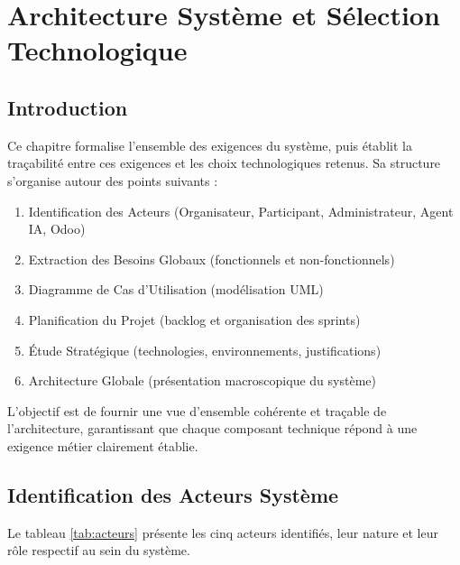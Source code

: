 \chapter{Architecture Système et Sélection Technologique}

\section*{Introduction}
Ce chapitre formalise l'ensemble des exigences du système, puis établit la traçabilité entre ces exigences et les choix technologiques retenus. Sa structure s'organise autour des points suivants :

\begin{enumerate}
    \item Identification des Acteurs (Organisateur, Participant, Administrateur, Agent IA, Odoo)
    \item Extraction des Besoins Globaux (fonctionnels et non-fonctionnels)
    \item Diagramme de Cas d'Utilisation (modélisation UML)
    \item Planification du Projet (backlog et organisation des sprints)
    \item Étude Stratégique (technologies, environnements, justifications)
    \item Architecture Globale (présentation macroscopique du système)
\end{enumerate}

L'objectif est de fournir une vue d'ensemble cohérente et traçable de l'architecture, garantissant que chaque composant technique répond à une exigence métier clairement établie.

\section{Identification des Acteurs Système}
Le tableau \ref{tab:acteurs} présente les cinq acteurs identifiés, leur nature et leur rôle respectif au sein du système.

